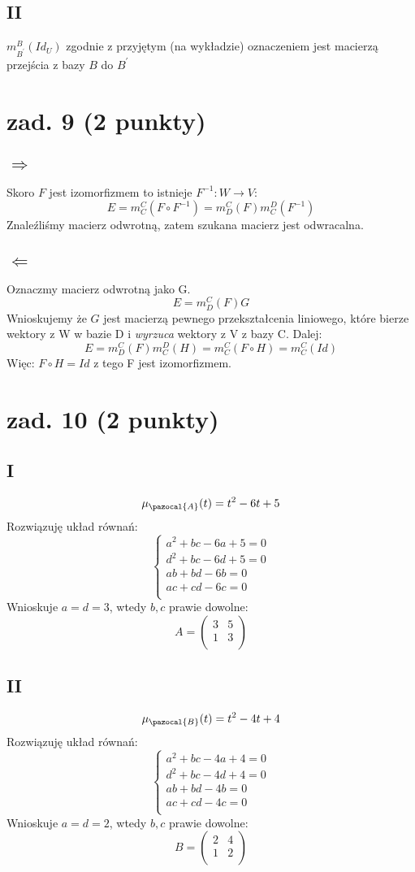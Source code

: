 \documentclass{article}
\begin{document}
\subsection*{II}

$
m_{B^\prime}^B(Id_U)
$
zgodnie z przyjętym (na wykładzie) oznaczeniem jest macierzą przejścia z bazy $B$ do $B^\prime$
\section{zad. 9 (2 punkty)}
\subsection*{$\Rightarrow$}
Skoro $F$ jest izomorfizmem to istnieje $F^{-1}:W\rightarrow V$:
$$
E = m_C^C(F\circ F^{-1}) = m_D^C(F)m_C^D(F^{-1})
$$
Znaleźliśmy macierz odwrotną, zatem szukana macierz jest odwracalna.
\subsection*{$\Leftarrow$}
Oznaczmy macierz odwrotną jako G.
$$
E = m_D^C(F)G
$$
Wnioskujemy że $G$ jest macierzą pewnego przekształcenia liniowego, które bierze wektory z W w bazie D i \textit{wyrzuca} wektory z V z bazy C. Dalej:
$$
E = m_D^C(F)m_C^D(H) = m_C^C(F\circ H) = m_C^C(Id)
$$
Więc: $F\circ H = Id$ z tego F jest izomorfizmem.
\section{zad. 10 (2 punkty)}
\subsection*{I}
$$
\mu_{\pazocal{A}}(t) = t^2 - 6t + 5
$$
Rozwiązuję układ równań:
$$
\begin{cases}
a^2 + bc - 6a + 5 = 0\\
d^2 + bc - 6d + 5 = 0\\
ab+bd-6b=0\\
ac+cd-6c=0\\
\end{cases}
$$
Wnioskuje $a = d = 3$, wtedy $b,c$ prawie dowolne:
$$
A =
\begin{pmatrix}
3 & 5 \\
1 & 3 \\
\end{pmatrix}
$$
\subsection*{II}
$$
\mu_{\pazocal{B}}(t) = t^2 - 4t + 4
$$
Rozwiązuję układ równań:
$$
\begin{cases}
a^2 + bc - 4a + 4 = 0\\
d^2 + bc - 4d + 4 = 0\\
ab+bd-4b=0\\
ac+cd-4c=0\\
\end{cases}
$$
Wnioskuje $a = d = 2$, wtedy $b,c$ prawie dowolne:
$$
B =
\begin{pmatrix}
2 & 4 \\
1 & 2 \\
\end{pmatrix}
$$
\end{document}
